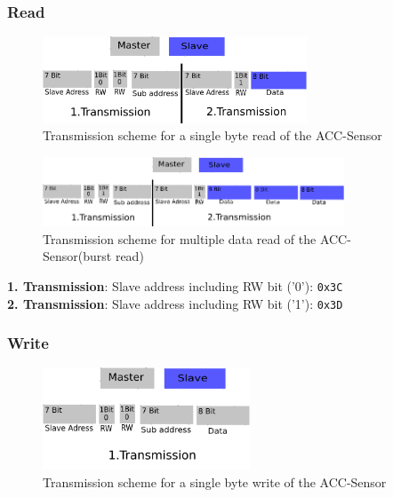 \begin{itemize}
\begin{itemize}
\subsubsection{Read}
\label{subsubsec:ACCread}

\begin{figure}[H]
	\centering\includegraphics[width=0.7\textwidth]{fig/I2C_Adressing/ACC_read_single}
	\caption{Transmission scheme for a single byte read of the ACC-Sensor}
	\label{fig:ACC1}
\end{figure}

\begin{figure}[H]
	\centering\includegraphics[width=0.8\textwidth]{fig/I2C_Adressing/ACC_read_multiple}
	\caption[Scheme for multiple data read of the ACC-Sensor]{Transmission scheme for multiple data read of the ACC-Sensor(burst read)}
	\label{fig:ACC2}
\end{figure}

\textbf{1. Transmission}: Slave address including RW bit ('0'): \texttt{0x3C}\\
\textbf{2. Transmission}: Slave address including RW bit ('1'): \texttt{0x3D}

\subsubsection{Write}
\label{subsubsec:ACCwrite}

\begin{figure}[H]
	\centering\includegraphics[width=0.55\textwidth]{fig/I2C_Adressing/ACC_write_single}
	\caption[Scheme for a single byte write of the ACC-Sensor]{Transmission scheme for a single byte write of the ACC-Sensor}
	\label{fig:ACC3}
\end{figure}


\end{itemize}
\end{itemize}

